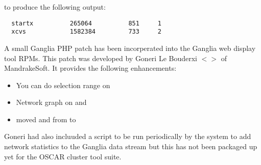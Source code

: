 \noindent to produce the following output:

\begin{verbatim}
  startx          265064          851     1
  xcvs            1582384         733     2
\end{verbatim}

A small Ganglia PHP patch has been incorperated into the Ganglia web
display tool RPMs. This patch was developed by Goneri Le Bouderxi
$<$$>$ of MandrakeSoft. It provides
the following enhancements:

\begin{itemize}
\item You can  do selection range on 
\item Network graph on  and 
\item moved  and  from
   to 
\end{itemize}
        
Goneri had also incluuded a  script to be run
periodically by the  system to add network statistics to the
Ganglia data stream but this has not been packaged up yet for the
OSCAR cluster tool suite.

